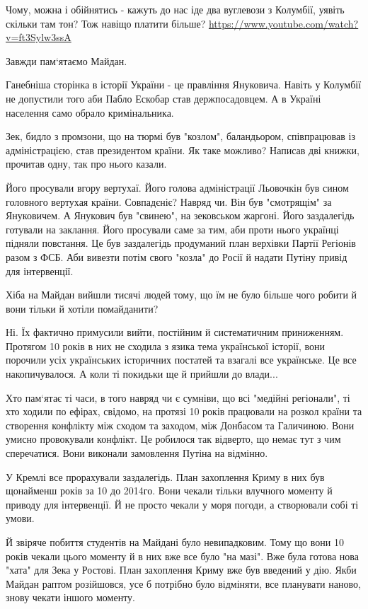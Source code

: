 \begin{itemize}

Чому, можна і обійнятись - кажуть до нас іде два вуглевози з Колумбії, уявіть
скільки там тон? Тож навіщо платити більше?
\url{https://www.youtube.com/watch?v=ft3Sylw3ssA}


Завжди пам`ятаємо Майдан.

Ганебніша сторінка в історії України - це правління Януковича. Навіть у
Колумбії не допустили того аби Пабло Ескобар став держпосадовцем. А в Україні
населення само обрало кримінальника.

Зек, бидло з промзони, що на тюрмі був "козлом", баландьором, співпрацював із
адміністрацією, став президентом країни. Як таке можливо? Написав дві книжки,
прочитав одну, так про нього казали.

Його просували вгору вертухаї. Його голова адміністрації Льовочкін був сином
головного вертухая країни. Совпадєніє? Навряд чи. Він був "смотрящім" за
Януковичем. А Янукович був "свинею", на зековськом жаргоні. Його заздалегідь
готували на заклання. Його просували саме за тим, аби проти нього українці
підняли повстання. Це був заздалегідь продуманий план верхівки Партії Регіонів
разом з ФСБ. Аби вивезти потім свого "козла" до Росії й надати Путіну привід
для інтервенції.

Хіба на Майдан вийшли тисячі людей тому, що їм не було більше чого робити й
вони тільки й хотіли помайданити?

Ні. Їх фактично примусили вийти, постійним й систематичним приниженням.
Протягом 10 років в них не сходила з язика тема української історії, вони
порочили усіх українських історичних постатей та взагалі все українське. Це все
накопичувалося. А коли ті покидьки ще й прийшли до влади...

Хто пам`ятає ті часи, в того навряд чи є сумніви, що всі "медійні регіонали",
ті хто ходили по ефірах, свідомо, на протязі 10 років працювали на розкол
країни та створення конфлікту між сходом та заходом, між Донбасом та Галичиною.
Вони умисно провокували конфлікт. Це робилося так відверто, що немає тут з чим
сперечатися. Вони виконали замовлення Путіна на відмінно.

У Кремлі все прорахували заздалегідь. План захоплення Криму в них був щонайменш
років за 10 до 2014го. Вони чекали тільки влучного моменту й приводу для
інтервенції. Й не просто чекали у моря погоди, а створювали собі ті умови.

Й звіряче побиття студентів на Майдані було невипадковим. Тому що вони 10 років
чекали цього моменту й в них вже все було "на мазі". Вже була готова нова
"хата" для Зека у Ростові. План захоплення Криму вже був введений у дію. Якби
Майдан раптом розійшовся, усе б потрібно було відміняти, все планувати наново,
знову чекати іншого моменту.


\end{itemize}
